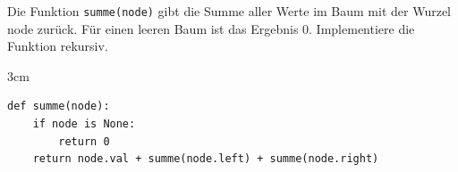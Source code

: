 \question[3]
Die Funktion \texttt{summe(node)} gibt die Summe aller Werte im Baum mit der Wurzel node zurück. Für einen leeren Baum ist
das Ergebnis 0. Implementiere die Funktion rekursiv.
\begin{solutionbox}{3cm}
\begin{lstlisting}
def summe(node):
    if node is None:
        return 0
    return node.val + summe(node.left) + summe(node.right)
\end{lstlisting}
\end{solutionbox}
